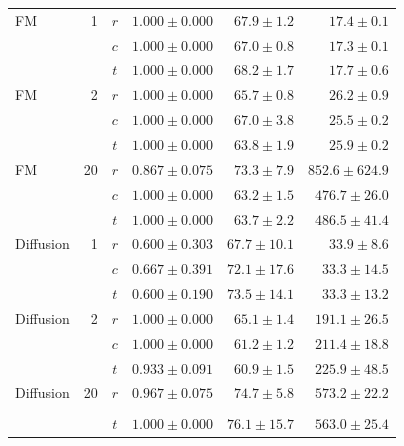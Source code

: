 \begin{table}[htpb]
\begin{tabularx}{\linewidth}{@{}L r c rrr@{}}
    \midrule
    FM         & 1 & $r$ & $1.000 \pm 0.000$ & $67.9 \pm 1.2$ & $17.4 \pm 0.1$ \\
                     &    & \textbf{$c$} & \textbf{$1.000 \pm 0.000$} & \textbf{$67.0 \pm 0.8$} & \textbf{$17.3 \pm 0.1$} \\
                     &    & $t$ & $1.000 \pm 0.000$ & $68.2 \pm 1.7$ & $17.7 \pm 0.6$ \\
    FM         & 2 & $r$ & $1.000 \pm 0.000$ & $65.7 \pm 0.8$ & $26.2 \pm 0.9$ \\
                     &    & $c$ & $1.000 \pm 0.000$ & $67.0 \pm 3.8$ & $25.5 \pm 0.2$ \\
                     &    & $t$ & $1.000 \pm 0.000$ & $63.8 \pm 1.9$ & $25.9 \pm 0.2$ \\
    FM         & 20 & $r$ & $0.867 \pm 0.075$ & $73.3 \pm 7.9$ & $852.6 \pm 624.9$ \\
                     &    & $c$ & $1.000 \pm 0.000$ & $63.2 \pm 1.5$ & $476.7 \pm 26.0$ \\
                     &    & $t$ & $1.000 \pm 0.000$ & $63.7 \pm 2.2$ & $486.5 \pm 41.4$ \\
    \midrule
    Diffusion  & 1 & $r$ & $0.600 \pm 0.303$ & $67.7 \pm 10.1$ & $33.9 \pm 8.6$ \\
                     &    & $c$ & $0.667 \pm 0.391$ & $72.1 \pm 17.6$ & $33.3 \pm 14.5$ \\
                     &    & $t$ & $0.600 \pm 0.190$ & $73.5 \pm 14.1$ & $33.3 \pm 13.2$ \\
    Diffusion  & 2 & \textbf{$r$} & \textbf{$1.000 \pm 0.000$} & \textbf{$65.1 \pm 1.4$} & \textbf{$191.1 \pm 26.5$} \\
                     &    & \textbf{$c$} & \textbf{$1.000 \pm 0.000$} & \textbf{$61.2 \pm 1.2$} & \textbf{$211.4 \pm 18.8$} \\
                     &    & $t$ & $0.933 \pm 0.091$ & $60.9 \pm 1.5$ & $225.9 \pm 48.5$ \\
    Diffusion  & 20 & $r$ & $0.967 \pm 0.075$ & $74.7 \pm 5.8$ & $573.2 \pm 22.2$ \\
                     &    &  &  &  &   \\
                     &    & $t$ & $1.000 \pm 0.000$ & $76.1 \pm 15.7$ & $563.0 \pm 25.4$ \\
    \bottomrule
  \end{tabularx}
\end{table}

